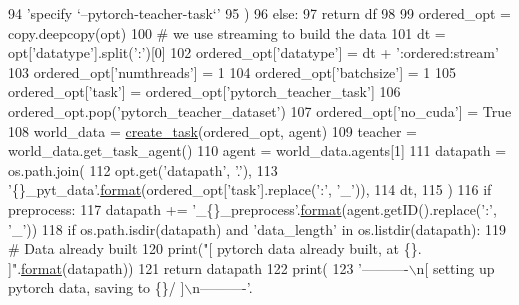 \begin{DoxyCode}
94                 \textcolor{stringliteral}{'specify `--pytorch-teacher-task`'}
95             )
96         \textcolor{keywordflow}{else}:
97             \textcolor{keywordflow}{return} df
98 
99     ordered\_opt = copy.deepcopy(opt)
100     \textcolor{comment}{# we use streaming to build the data}
101     dt = opt[\textcolor{stringliteral}{'datatype'}].split(\textcolor{stringliteral}{':'})[0]
102     ordered\_opt[\textcolor{stringliteral}{'datatype'}] = dt + \textcolor{stringliteral}{':ordered:stream'}
103     ordered\_opt[\textcolor{stringliteral}{'numthreads'}] = 1
104     ordered\_opt[\textcolor{stringliteral}{'batchsize'}] = 1
105     ordered\_opt[\textcolor{stringliteral}{'task'}] = ordered\_opt[\textcolor{stringliteral}{'pytorch\_teacher\_task'}]
106     ordered\_opt.pop(\textcolor{stringliteral}{'pytorch\_teacher\_dataset'})
107     ordered\_opt[\textcolor{stringliteral}{'no\_cuda'}] = \textcolor{keyword}{True}
108     world\_data = \hyperlink{namespaceparlai_1_1core_1_1worlds_a11923c10b545c7ecc1b08fe2242d9c2c}{create\_task}(ordered\_opt, agent)
109     teacher = world\_data.get\_task\_agent()
110     agent = world\_data.agents[1]
111     datapath = os.path.join(
112         opt.get(\textcolor{stringliteral}{'datapath'}, \textcolor{stringliteral}{'.'}),
113         \textcolor{stringliteral}{'\{\}\_pyt\_data'}.\hyperlink{namespaceparlai_1_1chat__service_1_1services_1_1messenger_1_1shared__utils_a32e2e2022b824fbaf80c747160b52a76}{format}(ordered\_opt[\textcolor{stringliteral}{'task'}].replace(\textcolor{stringliteral}{':'}, \textcolor{stringliteral}{'\_'})),
114         dt,
115     )
116     \textcolor{keywordflow}{if} preprocess:
117         datapath += \textcolor{stringliteral}{'\_\{\}\_preprocess'}.\hyperlink{namespaceparlai_1_1chat__service_1_1services_1_1messenger_1_1shared__utils_a32e2e2022b824fbaf80c747160b52a76}{format}(agent.getID().replace(\textcolor{stringliteral}{':'}, \textcolor{stringliteral}{'\_'}))
118     \textcolor{keywordflow}{if} os.path.isdir(datapath) \textcolor{keywordflow}{and} \textcolor{stringliteral}{'data\_length'} \textcolor{keywordflow}{in} os.listdir(datapath):
119         \textcolor{comment}{# Data already built}
120         print(\textcolor{stringliteral}{"[ pytorch data already built, at \{\}. ]"}.\hyperlink{namespaceparlai_1_1chat__service_1_1services_1_1messenger_1_1shared__utils_a32e2e2022b824fbaf80c747160b52a76}{format}(datapath))
121         \textcolor{keywordflow}{return} datapath
122     print(
123         \textcolor{stringliteral}{'----------\(\backslash\)n[ setting up pytorch data, saving to \{\}/ ]\(\backslash\)n----------'}.

\end{DoxyCode}
